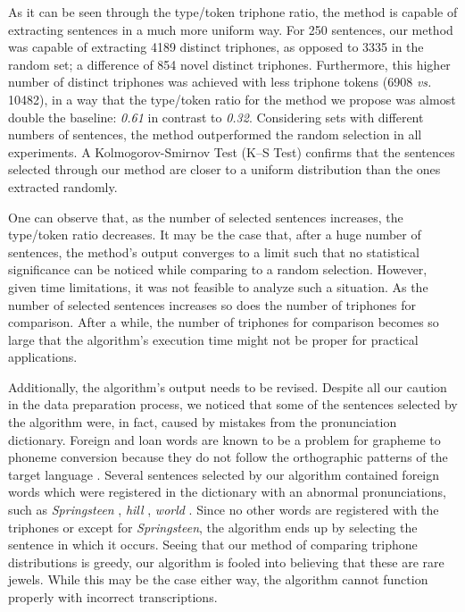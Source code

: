 As it can be seen through the type/token triphone ratio, the method is capable of extracting sentences in a much more uniform way. 
For 250 sentences, our method was capable of extracting 4189 distinct triphones, as opposed to 3335 in the random set; a difference of 854 
novel distinct triphones. Furthermore, this higher number of distinct triphones was achieved with less triphone tokens (6908 \emph{vs.} 10482), in a way that the type/token 
ratio for the method we propose was almost double the baseline: \emph{0.61} in contrast to \emph{0.32}. Considering sets with different 
numbers of sentences, the method outperformed the random selection in all experiments. A Kolmogorov-Smirnov Test 
(K--S Test) confirms that the sentences selected through our method are closer to a uniform distribution than the ones extracted randomly.

One can observe that, as the number of selected sentences increases, the type/token ratio decreases. It may be the case that, 
after a huge number of sentences, the method's output converges to a limit such that no statistical significance can be noticed 
while comparing to a random selection. However, given time limitations, it was not feasible to analyze such a situation.
As the number of selected sentences increases so does the number of triphones for comparison. After a while,
the number of triphones for comparison becomes so large that the algorithm's execution time might not be proper for 
practical applications.

Additionally, the algorithm's output needs to be revised. Despite all our caution in the data preparation process, we noticed
that some of the sentences selected by the algorithm were, in fact, caused by mistakes from the pronunciation dictionary.
Foreign and loan words are known to be a problem for grapheme to 
phoneme conversion because they do not follow the orthographic patterns of the target language \cite{Steigner2007}. Several 
sentences selected by our algorithm contained foreign words which were registered in the dictionary with an abnormal pronunciations, such
as \emph{Springsteen} , \emph{hill} \textipa{[iww]}, \emph{world} \textipa{[wohwdZ]}. Since no other words are registered with the triphones \textipa{[e-e+\~e]} or \textipa{[e-\~e]} except for 
\emph{Springsteen}, the algorithm ends up by selecting the sentence in which it occurs. Seeing that our method 
of comparing triphone distributions is greedy, our algorithm is fooled into believing that these are rare jewels. 
While this may be the case either way, the algorithm cannot function properly with incorrect transcriptions. 

